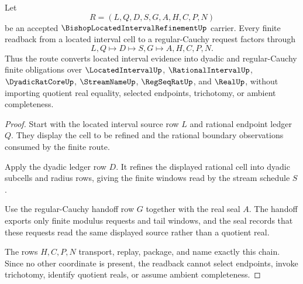 \begin{theorem}
\label{thm:bishop-located-interval-refinement-cauchy-route}
Let
$$
R=(L,Q,D,S,G,A,H,C,P,N)
$$
be an accepted $\BishopLocatedIntervalRefinementUp$ carrier. Every finite readback from a located interval cell to a regular-Cauchy request factors through
$$
L,Q \longmapsto D \longmapsto S,G \longmapsto A,H,C,P,N .
$$
Thus the route converts located interval evidence into dyadic and regular-Cauchy finite obligations over $\LocatedIntervalUp$, $\RationalIntervalUp$, $\DyadicRatCoreUp$, $\StreamNameUp$, $\RegSeqRatUp$, and $\RealUp$, without importing quotient real equality, selected endpoints, trichotomy, or ambient completeness.
\end{theorem}
\begin{proof}
Start with the located interval source row $L$ and rational endpoint ledger $Q$. They display the cell to be refined and the rational boundary observations consumed by the finite route.

Apply the dyadic ledger row $D$. It refines the displayed rational cell into dyadic subcells and radius rows, giving the finite windows read by the stream schedule $S$.

Use the regular-Cauchy handoff row $G$ together with the real seal $A$. The handoff exports only finite modulus requests and tail windows, and the seal records that these requests read the same displayed source rather than a quotient real.

The rows $H,C,P,N$ transport, replay, package, and name exactly this chain. Since no other coordinate is present, the readback cannot select endpoints, invoke trichotomy, identify quotient reals, or assume ambient completeness.
\end{proof}


\begin{closurestatus}{\BishopLocatedIntervalRefinementUp}
  \theoryclosure{\seedClosure}
  \formalstatus{\unformalizedV}
\end{closurestatus}
